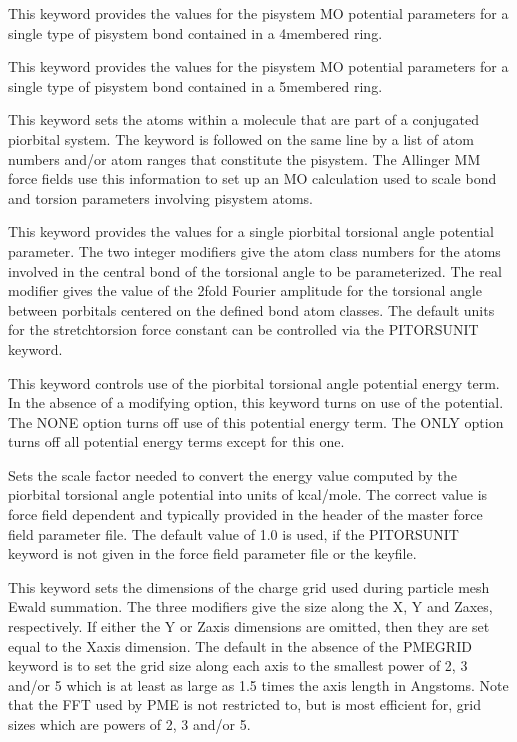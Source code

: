 \documentclass[letterpaper,11pt,english]{sphinxmanual}
\begin{document}
  This keyword provides the values for the pisystem MO potential parameters for a single type of pisystem bond contained in a 4\sphinxhyphen{}membered ring.

  This keyword provides the values for the pisystem MO potential parameters for a single type of pisystem bond contained in a 5\sphinxhyphen{}membered ring.

  This keyword sets the atoms within a molecule that are part of a conjugated pi\sphinxhyphen{}orbital system. The keyword is followed on the same line by a list of atom numbers and/or atom ranges that constitute the pi\sphinxhyphen{}system. The Allinger MM force fields use this information to set up an MO calculation used to scale bond and torsion parameters involving pi\sphinxhyphen{}system atoms.

  This keyword provides the values for a single pi\sphinxhyphen{}orbital torsional angle potential parameter. The two integer modifiers give the atom class numbers for the atoms involved in the central bond of the torsional angle to be parameterized. The real modifier gives the value of the 2\sphinxhyphen{}fold Fourier amplitude for the torsional angle between p\sphinxhyphen{}orbitals centered on the defined bond atom classes. The default units for the stretch\sphinxhyphen{}torsion force constant can be controlled via the PITORSUNIT keyword.

  This keyword controls use of the pi\sphinxhyphen{}orbital torsional angle potential energy term. In the absence of a modifying option, this keyword turns on use of the potential. The NONE option turns off use of this potential energy term. The ONLY option turns off all potential energy terms except for this one.

  Sets the scale factor needed to convert the energy value computed by the pi\sphinxhyphen{}orbital torsional angle potential into units of kcal/mole. The correct value is force field dependent and typically provided in the header of the master force field parameter file. The default value of 1.0 is used, if the PITORSUNIT keyword is not given in the force field parameter file or the keyfile.

  This keyword sets the dimensions of the charge grid used during particle mesh Ewald summation. The three modifiers give the size along the X\sphinxhyphen{}, Y\sphinxhyphen{} and Z\sphinxhyphen{}axes, respectively. If either the Y\sphinxhyphen{} or Z\sphinxhyphen{}axis dimensions are omitted, then they are set equal to the X\sphinxhyphen{}axis dimension. The default in the absence of the PME\sphinxhyphen{}GRID keyword is to set the grid size along each axis to the smallest power of 2, 3 and/or 5 which is at least as large as 1.5 times the axis length in Angstoms. Note that the FFT used by PME is not restricted to, but is most efficient for, grid sizes which are powers of 2, 3 and/or 5.
\end{document}
